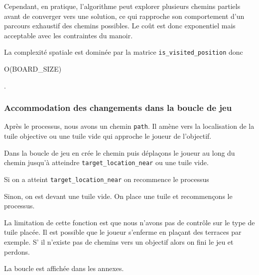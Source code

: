   Cependant, en pratique, l’algorithme peut explorer plusieurs chemins partiels avant de converger vers une solution, ce qui rapproche son comportement d’un parcours exhaustif des chemins possibles. Le coût est donc exponentiel mais acceptable avec les contraintes du manoir.

La complexité spatiale est dominée par la matrice \texttt{is\_visited\_position} donc \begin{scriptsize}O(BOARD\_SIZE)\end{scriptsize}.

\subsubsection{Accommodation des changements dans la boucle de jeu}

Après le processus, nous avons un chemin \texttt{path}. Il amène vers la localisation de la tuile objective ou une tuile vide qui approche le joueur de l'objectif.

Dans la boucle de jeu en crée le chemin puis déplaçons le joueur au long du chemin jusqu'à atteindre \texttt{target\_location\_near} ou une tuile vide.

Si on a atteint \texttt{target\_location\_near} on recommence le processus

Sinon, on est devant une tuile vide. On place une tuile et recommençons le processus.

La limitation de cette fonction est que nous n'avons pas de contrôle sur le type de tuile placée. Il est possible que le joueur s'enferme en plaçant des terraces par exemple. S' il n'existe pas de chemins vers un objectif alors on fini le jeu et perdons.

La boucle est affichée dans les annexes.
